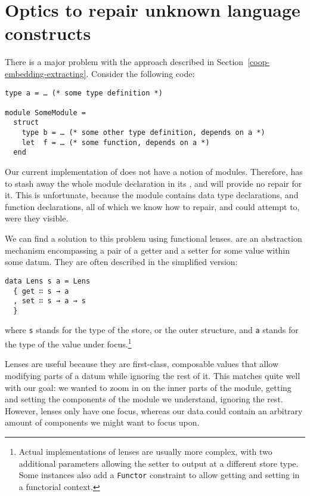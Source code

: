 \section{Optics to repair unknown language constructs}\label{coop-optics}

There is a major problem with the approach described in
Section~\ref{coop-embedding-extracting}.  Consider the following \OCaml{} code:

\begin{verbatim}
type a = … (* some type definition *)

module SomeModule =
  struct
    type b = … (* some other type definition, depends on a *)
    let  f = … (* some function, depends on a *)
  end
\end{verbatim}

Our current implementation of \Chick{} does not have a notion of modules.
Therefore, \Coop{} has to stash away the whole module declaration in its
, and will provide no repair for it.  This is
unfortunate, because the module contains data type declarations, and function
declarations, all of which we know how to repair, and could attempt to, were
they visible.

We can find a solution to this problem using functional lenses.  
are an abstraction mechanism encompassing a pair of a getter and a setter for
some value within some datum.  They are often described in the simplified
version:

\begin{verbatim}
data Lens s a = Lens
  { get ∷ s → a
  , set ∷ s → a → s
  }
\end{verbatim}

\noindent where \texttt{s} stands for the type of the store, or the
outer structure, and \texttt{a} stands for the type of the value
under focus.\footnote{Actual implementations of lenses are usually more complex,
with two additional parameters allowing the setter to output at a different
store type. Some instances also add a \texttt{Functor} constraint
to allow getting and setting in a functorial context.}

Lenses are useful because they are first-class, composable values that allow
modifying parts of a datum while ignoring the rest of it.  This matches quite
well with our goal: we wanted to zoom in on the inner parts of the module,
getting and setting the components of the module we understand, ignoring the
rest.  However, lenses only have one focus, whereas our data could contain
an arbitrary amount of components we might want to focus upon.

